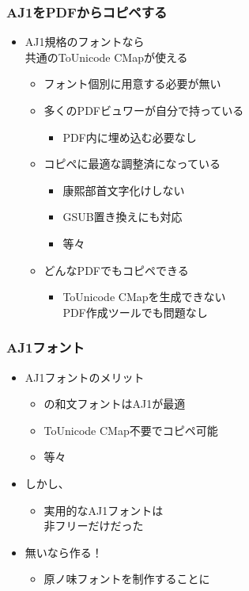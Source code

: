 \begin{frame}\frametitle{AJ1をPDFからコピペする}
  \begin{itemize}
  \item AJ1規格のフォントなら \\ 共通のToUnicode CMapが使える
    \begin{itemize}
    \item フォント個別に用意する必要が無い
    \item 多くのPDFビュワーが自分で持っている
      \begin{itemize}
      \item PDF内に埋め込む必要なし
      \end{itemize}
    \item コピペに最適な調整済になっている
      \begin{itemize}
      \item 康熙部首文字化けしない
      \item GSUB置き換えにも対応
      \item 等々
      \end{itemize}
    \item どんなPDFでもコピペできる
      \begin{itemize}
      \item ToUnicode CMapを生成できない \\ PDF作成ツールでも問題なし
      \end{itemize}
    \end{itemize}
  \end{itemize}
\end{frame}

\begin{frame}\frametitle{AJ1フォント}
  \begin{itemize}
  \item AJ1フォントのメリット
    \begin{itemize}
    \item \pTeX の和文フォントはAJ1が最適
    \item ToUnicode CMap不要でコピペ可能
    \item 等々
    \end{itemize}
  \item しかし、
    \begin{itemize}
    \item 実用的なAJ1フォントは \\ 非フリーだけだった
    \end{itemize}
  \item 無いなら作る！
    \begin{itemize}
    \item 原ノ味フォントを制作することに
    \end{itemize}
  \end{itemize}
\end{frame}

